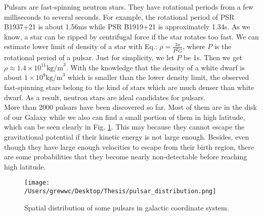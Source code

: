 \documentclass[12pt]{report}
\newcommand{\add}[1]{
  $<$\colorbox{red}{\textbf{add}}$>$#1$<$\colorbox{red}{\textbf{/add}}$>$
}
\begin{document}
        Pulsars are fast-spinning neutron stars. They have rotational periods from a few 
        milliseconds to several seconds. For example, the rotational period of PSR B1937+21 is about 1.56ms 
        while PSR B1919+21 is approximately 1.34s. As we know, a star can be ripped by centrifugal force if the
        star rotates too fast. We can estimate lower limit of density of a star with Eq.: 
        $\rho=\frac{3\pi}{P^2G}$, where $P$ is the rotational period of a pulsar. Just for simplicity, we
        let $P$ be 1s. Then we get $\rho\approx 1.4\times 10^{11}\mbox{kg/m}^3$. With the knowledge that the 
        density of a white dwarf is about $1\times 10^9\mbox{kg/m}^3$ which is smaller than the lower density limit,
        the observed fast-spinning stars belong to the kind of stars which are much denser 
        than white dwarf. As a result, neutron stars are ideal candidates for pulsars. \\
        \indent
        More than 2000 pulsars have been discovered so far. Most of them are in the disk of our Galaxy 
        while we also can find a small portion of them in high latitude, which can be seen clearly in Fig. 
        \ref{fig: spatial_distribution}. This may 
        because they cannot escape the gravitational potential if their kinetic energy is not large enough. Besides,
        even though they have large enough velocities to escape from their birth region, there are some 
        probabilities that they become nearly non-detectable before reaching high latitude. 

        \begin{figure}[h]
          \centering
          \texttt{[image: /Users/grewwc/Desktop/Thesis/pulsar\_distribution.png]}
          \caption{Spatial distribution of some pulsars in galactic coordinate system.}
          \label{fig: spatial_distribution}
        \end{figure}
        



\end{document}
